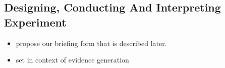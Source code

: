 \subsection{Designing, Conducting And Interpreting Experiment}

\begin{itemize}
	\item propose our briefing form that is described later.
	\item set in context of evidence generation
\end{itemize}
